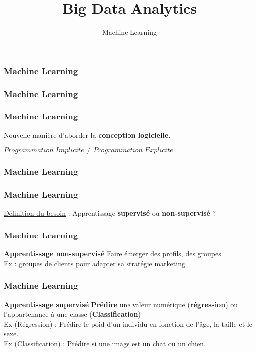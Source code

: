 \documentclass{formation}
\title{Big Data Analytics}
\subtitle{Machine Learning}
\begin{document}
\maketitle

\begin{frame}
  \frametitle{Machine Learning}
\end{frame}

\begin{frame}
  \frametitle{Machine Learning}
\end{frame}

\begin{frame}
  \frametitle{Machine Learning}
  \begin{center}
  Nouvelle manière d'aborder la \textbf{conception logicielle}.
  \end{center}
  \begin{center}
  $\boxed{Programmation\;Implicite \neq Programmation\;Explicite}$
  \end{center}
\end{frame}

\begin{frame}
  \frametitle{Machine Learning}
\end{frame}

\begin{frame}
  \frametitle{Machine Learning}
  \underline{Définition du besoin} :
  \newline
  \newline
  Apprentissage \textbf{supervisé} ou \textbf{non-supervisé} ?
\end{frame}

\begin{frame}
  \frametitle{Machine Learning}
  \textbf{Apprentissage non-supervisé}
  \newline \newline
  Faire émerger des profils, des groupes \\
  \newline
  Ex : groupes de clients pour adapter sa stratégie marketing \\
\end{frame}

\begin{frame}
  \frametitle{Machine Learning}
  \textbf{Apprentissage supervisé}
  \newline \newline
  \textbf{Prédire} une valeur numérique (\textbf{régression}) ou l'appartenance à une classe (\textbf{Classification}) \\
  \newline
  Ex (Régression)     : Prédire le poid d'un individu en fonction de l'âge, la taille et le sexe. \\
  Ex (Classification) : Prédire si une image est un chat ou un chien. \\
\end{frame}
\end{document}
